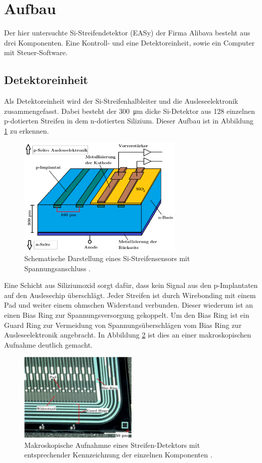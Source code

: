 \newpage
\section{Aufbau}
\label{sec:Aufbau}
Der hier untersuchte Si-Streifendetektor (EASy) der Firma Alibava besteht aus drei Komponenten.
Eine Kontroll- und eine Detektoreinheit, sowie ein Computer mit Steuer-Software.

\subsection{Detektoreinheit}
\label{sec:Detektoreinheit}
 Als Detektoreinheit wird der Si-Streifenhalbleiter und die Ausleseelektronik
 zusammengefasst. Dabei besteht der \SI{300}{\micro\meter} dicke Si-Detektor
 aus 128 einzelnen p-dotierten Streifen in dem n-dotierten Silizium.  Dieser
 Aufbau ist in Abbildung \ref{fig:schema} zu erkennen.
 \begin{figure}[htb]
   \centering
   \includegraphics[width=0.7\textwidth]{images/Schema.png}
   \caption{Schematische Darstellung eines Si-Streifensensors mit Spannungsanschluss \cite{anleitung}.}
   \label{fig:schema}
 \end{figure}
Eine Schicht aus Siliziumoxid sorgt dafür, dass kein Signal aus den p-Implantaten
auf den Auslesechip überschlägt. Jeder Streifen ist durch Wirebonding mit einem Pad und weiter
einem ohmschen Widerstand verbunden.
Dieser wiederum ist an einen Bias Ring zur Spannungsversorgung gekoppelt.
Um den Bias Ring ist ein Guard Ring zur Vermeidung von Spannungsüberschlägen vom Bias
Ring zur Ausleseelektronik angebracht. In Abbildung \ref{fig:streifendetektor} ist dies an
einer makroskopischen Aufnahme deutlich gemacht.
\begin{figure}[htb]
  \centering
  \includegraphics[width=0.5\textwidth]{images/Sensor.png}
  \caption{Makroskopische Aufnahmne eines Streifen-Detektors mit entsprechender Kennzeichnung der einzelnen Komponenten \cite{anleitung}.}
  \label{fig:streifendetektor}
\end{figure}
